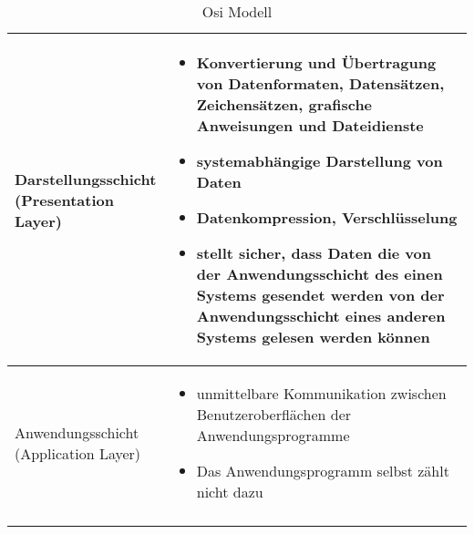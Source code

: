\begin{longtable}{@{}p{}@{\hspace{3em}}p{}}
    \makecell[l]{Darstellungsschicht \\ (Presentation Layer)}
        &
        \begin{itemize}
            \item Konvertierung und Übertragung von Datenformaten, Datensätzen, Zeichensätzen, grafische Anweisungen und Dateidienste
            \item systemabhängige Darstellung von Daten
            \item Datenkompression, Verschlüsselung
            \item stellt sicher, dass Daten die von der Anwendungsschicht des einen Systems gesendet werden von der Anwendungsschicht eines anderen Systems gelesen werden können
        \end{itemize}
    \\\hline

    \makecell[l]{Anwendungsschicht \\ (Application Layer)}
        &
        \begin{itemize}
            \item unmittelbare Kommunikation zwischen Benutzeroberflächen der Anwendungsprogramme
            \item Das Anwendungsprogramm selbst zählt nicht dazu
        \end{itemize}
    \\\hline
    \caption{Osi Modell}
    
\end{longtable}
